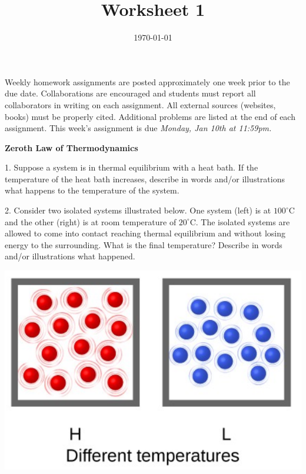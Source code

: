 \documentclass[11pt]{article}
\title{\textbf{Worksheet 1}}
\date{\vspace{-2em}\today}
\begin{document}
\maketitle

Weekly homework assignments are posted approximately one week prior to the
due date. Collaborations are encouraged and students must report all collaborators
in writing on each assignment. All external sources (websites, books) must be
properly cited. Additional problems are listed at the end of each assignment.
This week's assignment is due \textit{Monday, Jan 10th at 11:59pm.}

\textbf{Zeroth Law of Thermodynamics}

1. Suppose a system is in thermal equilibrium with a heat bath. If the temperature
of the heat bath increases, describe in words and/or illustrations what happens to
the temperature of the system.


\vspace{1in}

2. Consider two isolated systems illustrated below. One system (left) is at $100^\circ\text{C}$
and the other (right) is at room temperature of $20^\circ\text{C}$. The isolated systems are allowed
to come into contact reaching thermal equilibrium and without losing energy to the surrounding.
What is the final temperature? Describe in words and/or illustrations what happened.

\begin{center}
  \includegraphics[scale=0.2]{isolated_sys.png}
\end{center}
\end{document}
